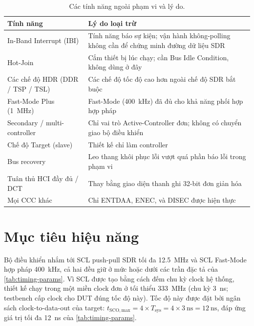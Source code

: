 \begin{table}[!htb]\centering
  \caption{Các tính năng ngoài phạm vi và lý do.}
  \label{tab:oos}
  \small
  \begin{tabular}{@{}>{\raggedright\arraybackslash}p{}
                     >{\raggedright\arraybackslash}p{}@{}}
    \toprule
    \textbf{Tính năng} & \textbf{Lý do loại trừ} \\
    \midrule
    In-Band Interrupt (IBI)            & Tính năng báo sự kiện; vận hành không-polling không cần để chứng minh đường dữ liệu SDR \\
    Hot-Join                           & Cắm thiết bị lúc chạy; cần Bus Idle Condition, không dùng ở đây \\
    Các chế độ HDR (DDR / TSP / TSL)   & Các chế độ tốc độ cao hơn ngoài chế độ SDR bắt buộc \\
    \iic{} Fast-Mode Plus (\SI{1}{\mega\hertz}) & Fast-Mode (\SI{400}{\kilo\hertz}) đã đủ cho khả năng phối hợp hợp pháp \\
    Secondary / multi-controller       & Chỉ vai trò Active-Controller đơn; không có chuyển giao bộ điều khiển \\
    Chế độ Target (slave)              & Thiết kế chỉ làm controller \\
    Bus recovery                       & Leo thang khôi phục lỗi vượt quá phần báo lỗi trong phạm vi \\
    Tuân thủ HCI đầy đủ / DCT          & Thay bằng giao diện thanh ghi 32-bit đơn giản hóa \\
    Mọi CCC khác                       & Chỉ ENTDAA, ENEC, và DISEC được hiện thực \\
    \bottomrule
  \end{tabular}
\end{table}

\section{Mục tiêu hiệu năng}
\label{sec:req-performance}

Bộ điều khiển nhắm tới SCL push-pull SDR tối đa \SI{12.5}{\mega\hertz} và SCL \iic{} Fast-Mode
hợp pháp \SI{400}{\kilo\hertz}, cả hai đều giữ ở mức hoặc dưới các trần đặc tả của
\cref{tab:timing-params}. Vì SCL được tạo bằng cách đếm chu kỳ clock hệ thống, thiết kế chạy
trong một miền clock đơn ở tối thiểu \SI{333}{\mega\hertz} (chu kỳ \SI{3}{\nano\second};
testbench cấp clock cho DUT đúng tốc độ này). Tốc độ này được đặt bởi ngân sách clock-to-data-out
của target: $t_{\mathrm{SCO,max}} = 4 \times T_{\mathrm{sys}} = 4 \times \SI{3}{\nano\second} =
\SI{12}{\nano\second}$, đáp ứng giá trị tối đa \SI{12}{\nano\second} của \cref{tab:timing-params}.

